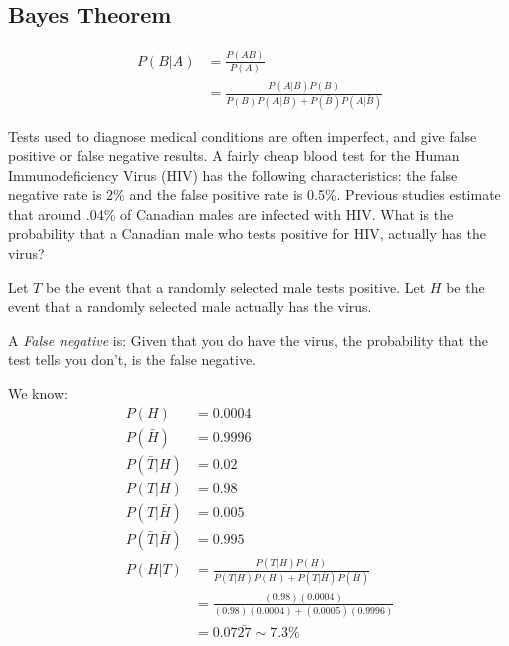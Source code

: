                 \subsection{Bayes Theorem} %
                \label{sub:bayes_theorem}
                    \begin{align*}
                        P (B | A) &= \frac{P(AB)}{P(A)} \\
                        &= \frac{P(A | B) P(B)} {P(B) P(A|B) + P(\bar{B}) P(A|\bar{B})}
                    \end{align*}

                    \ex Tests used to diagnose medical conditions are often imperfect, and give false positive or false negative results.
                    A fairly cheap blood test for the Human Immunodeficiency Virus (HIV) has the following characteristics: the false negative rate is 2\% and the false positive rate is 0.5\%.
                    Previous studies estimate that around .04\% of Canadian males are infected with HIV.
                    What is the probability that a Canadian male who tests positive for HIV, actually has the virus?

                    Let $T$ be the event that a randomly selected male tests positive.
                    Let $H$ be the event that a randomly selected male actually has the virus.

                    A \emph{False negative} is:
                    Given that you do have the virus, the probability that the test tells you don't, is the false negative.

                    We know:
                    \begin{align*}
                        P(H) &= 0.0004 \\
                        P(\bar{H}) &= 0.9996 \\
                        P(\bar{T} | H) &= 0.02 \\
                        P(T | H) &= 0.98 \\
                        P(T | \bar{H}) &= 0.005 \\
                        P(\bar{T} | \bar{H}) &= 0.995 \\
                        P (H | T) &= \frac{P(T | H) P(H)}
                        {P(T|H) P(H) + P(T| \bar{H})P(\bar{H})} \\
                        &= \frac{(0.98) (0.0004)}
                        {(0.98) (0.0004) + (0.0005)(0.9996)} \\
                        &= 0.07\bar{27} \sim 7.3\%
                    \end{align*}


